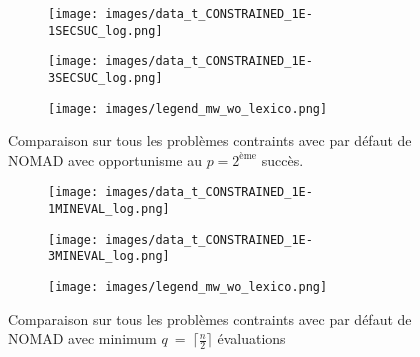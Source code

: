 \begin{figure}[!htb]
	\centering
	\begin{subfigure}{0.43\textwidth}
		\texttt{[image: images/data\_t\_CONSTRAINED\_1E-1SECSUC\_log.png]}
	\end{subfigure}%
	\begin{subfigure}{0.43\textwidth}
		\texttt{[image: images/data\_t\_CONSTRAINED\_1E-3SECSUC\_log.png]}
	\end{subfigure}
	\smallskip
	\begin{subfigure}{0.95\textwidth}
		\texttt{[image: images/legend\_mw\_wo\_lexico.png]}
	\end{subfigure}
	\caption{Comparaison sur tous les problèmes contraints avec \MADS par défaut de NOMAD avec opportunisme au $p=2^{\text{ème}}$ succès.}
	\label{fig:t_const_secsuc}
\end{figure}
\begin{figure}[!htb]
	\centering
	\begin{subfigure}{0.43\textwidth}
		\texttt{[image: images/data\_t\_CONSTRAINED\_1E-1MINEVAL\_log.png]}
	\end{subfigure}%
	\begin{subfigure}{0.43\textwidth}
		\texttt{[image: images/data\_t\_CONSTRAINED\_1E-3MINEVAL\_log.png]}
	\end{subfigure}
	\smallskip
	\begin{subfigure}{0.95\textwidth}
		\texttt{[image: images/legend\_mw\_wo\_lexico.png]}
	\end{subfigure}
	\caption{Comparaison sur tous les problèmes contraints avec \MADS par défaut de NOMAD avec minimum $q~=~\lceil\frac{n}{2}\rceil$ évaluations}
	\label{fig:t_const_mineval}
\end{figure}
